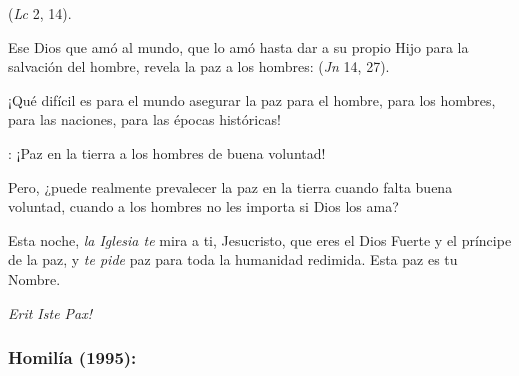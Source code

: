 \begin{body}
	 (\emph{Lc} 2, 14).
	
	Ese Dios que amó al mundo, que lo amó hasta dar a su propio Hijo para la salvación del hombre, revela la paz a los hombres:  (\emph{Jn} 14, 27).
	
	¡Qué difícil es para el mundo asegurar la paz para el hombre, para los hombres, para las naciones, para las épocas históricas!
	
	: ¡Paz en la tierra a los hombres de buena voluntad!
	
	Pero, ¿puede realmente prevalecer la paz en la tierra cuando falta buena voluntad, cuando a los hombres no les importa si Dios los ama?
	
	Esta noche, \emph{la Iglesia te} mira a ti, Jesucristo, que eres el Dios Fuerte y el príncipe de la paz, y \emph{te pide} paz para toda la humanidad redimida. Esta paz es tu Nombre.
	
	\emph{Erit Iste Pax!}
\end{body}

\subsubsection{Homilía (1995):} 


